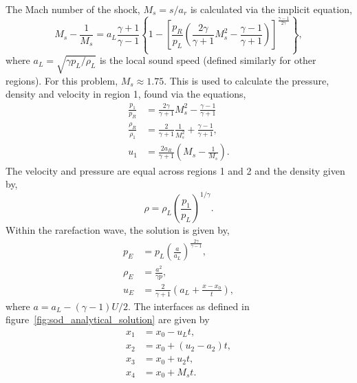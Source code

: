 The Mach number of the shock, $M_s = s/a_r$ is calculated via the implicit equation,
\begin{equation}
  \label{eq:mach_shock}
M_s - \frac{1}{M_s} = a_L \frac{\gamma + 1}{\gamma - 1} \left\{
1 - \left[
\frac{p_R}{p_L} \left(
\frac{2\gamma}{\gamma +1}M_s^2 - \frac{\gamma - 1}{\gamma +1} 
\right)
\right]^{\frac{\gamma - 1}{2\gamma}}
\right\},
\end{equation}
where $a_L = \sqrt{ \gamma p_L / \rho_L}$ is the local sound speed (defined similarly for other regions). For this problem, $M_s \approx 1.75$. This is used to calculate the pressure, density and velocity in region 1, found via the equations,
\begin{equation}
  \label{eq:sod_region1}
\begin{aligned}
\frac{p_1}{p_R} &= \frac{2\gamma}{\gamma + 1} M_s^2 - \frac{\gamma -1}{\gamma +1}\\
\frac{\rho_R}{\rho_1} &= \frac{2}{\gamma + 1} \frac{1}{M_s^2} + \frac{\gamma -1}{\gamma + 1},\\
u_1 &= \frac{2a_R}{\gamma + 1} \left( M_s - \frac{1}{M_s} \right).
\end{aligned}
\end{equation}
The velocity and pressure are equal across regions 1 and 2 and the density given by,
\begin{equation}
  \label{eq:sod_region2}
\rho = \rho_L \left( \frac{p_1}{p_L} \right)^{1/\gamma}.
\end{equation}
Within the rarefaction wave, the solution is given by,
\begin{equation}
  \label{eq:sod_regionE}
  \begin{aligned}
  p_E &= p_L \left( \frac{a}{a_L} \right)^{\frac{2\gamma}{\gamma-1}},\\
  \rho_E &= \frac{a^2}{\gamma p},\\
  u_E &= \frac{2}{\gamma +1} \left(a_L + \frac{x - x_0}{t}\right),
  \end{aligned}
\end{equation}
where $a = a_L - (\gamma-1)U/2$. The interfaces as defined in figure~\ref{fig:sod_analytical_solution} are given by
\begin{equation}
  \label{eq:sod_interfaces}
\begin{aligned}
x_1 &= x_0 - u_L t,\\
x_2 &= x_0 + (u_2 - a_2)t, \\
x_3 &= x_0 + u_2 t, \\
x_4 &= x_0 + M_s t.
\end{aligned}
\end{equation}

